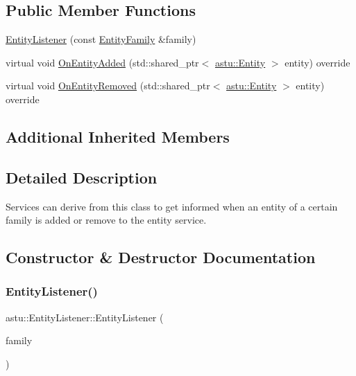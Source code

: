 \subsection*{Public Member Functions}
\begin{DoxyCompactItemize}
\item 
\hyperlink{classastu_1_1EntityListener_a16450ccf235ecd96db0f62e6bed7bb07}{Entity\+Listener} (const \hyperlink{classastu_1_1EntityFamily}{Entity\+Family} \&family)
\item 
virtual void \hyperlink{classastu_1_1EntityListener_a0c123b57dcabc4c2b6cee8f05db545c8}{On\+Entity\+Added} (std\+::shared\+\_\+ptr$<$ \hyperlink{classastu_1_1Entity}{astu\+::\+Entity} $>$ entity) override
\item 
virtual void \hyperlink{classastu_1_1EntityListener_ae380d941fafd6933a9f290ac50e7f32b}{On\+Entity\+Removed} (std\+::shared\+\_\+ptr$<$ \hyperlink{classastu_1_1Entity}{astu\+::\+Entity} $>$ entity) override
\end{DoxyCompactItemize}
\subsection*{Additional Inherited Members}


\subsection{Detailed Description}
Services can derive from this class to get informed when an entity of a certain family is added or remove to the entity service. 

\subsection{Constructor \& Destructor Documentation}
\mbox{\label{classastu_1_1EntityListener_a16450ccf235ecd96db0f62e6bed7bb07}} 
\subsubsection{\texorpdfstring{Entity\+Listener()}{EntityListener()}}
{\footnotesize\ttfamily astu\+::\+Entity\+Listener\+::\+Entity\+Listener (\begin{DoxyParamCaption}\item[{const \hyperlink{classastu_1_1EntityFamily}{Entity\+Family} \&}]{family }\end{DoxyParamCaption})\hspace{0.3cm}{\ttfamily [inline]}}

